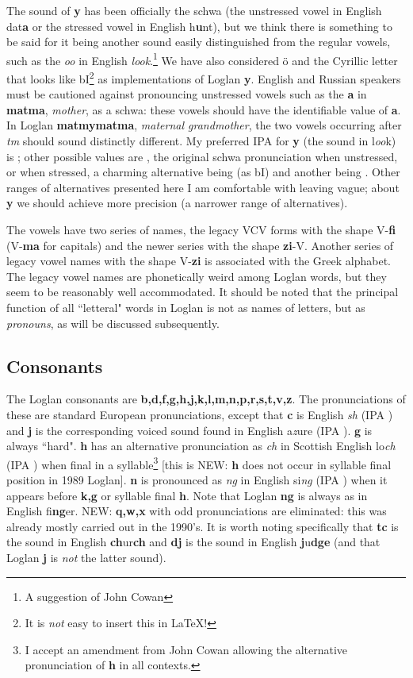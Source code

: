 \documentclass[12pt]{book}
\begin{document}
  The sound of {\bf y} has been officially the schwa (the unstressed vowel in English dat{\bf a} or the stressed vowel in English h{\bf u}nt), but we think there is something to be said for it being another sound easily distinguished from the regular vowels, such as the {\em oo} in English {\em look}.\footnote{A suggestion of John Cowan}  We have also considered \"o and the Cyrillic letter that looks like bI\footnote{It is {\em not\/} easy to insert this in LaTeX!} as implementations of Loglan {\bf y}.  English and Russian speakers must be cautioned against pronouncing unstressed vowels such as the
{\bf a} in {\bf matma}, {\em mother\/}, as a schwa:  these vowels should have the identifiable value of {\bf a}.  In Loglan {\bf matmymatma}, {\em maternal grandmother\/}, the two vowels occurring after {\em tm} should sound distinctly different.  My preferred IPA for {\bf y} (the sound in l{\em oo}k) is ;  other possible values are , the original schwa pronunciation when unstressed, or  when stressed, a charming alternative being  (as bI) and another being \textipa{\o}.  Other ranges of alternatives presented here I am comfortable with leaving vague;  about {\bf y} we should achieve more precision (a narrower range of alternatives).

The vowels have two series of names, the legacy VCV forms with the shape V-{\bf fi} (V-{\bf ma} for capitals) and the newer series with the shape {\bf zi}-V.  Another series of legacy vowel names with the shape V-{\bf zi} is associated with the Greek alphabet.  The legacy vowel names are phonetically weird among Loglan words, but they seem to be reasonably well accommodated.  It should be noted that the principal function of all ``letteral" words in Loglan is not as names of letters, but as {\em pronouns\/}, as will be discussed subsequently.
\subsection{Consonants}

The Loglan consonants are {\bf b,d,f,g,h,j,k,l,m,n,p,r,s,t,v,z}.  The pronunciations of these are standard European pronunciations, except that {\bf c} is English {\em sh} (IPA ) and {\bf j} is the corresponding voiced sound found in English a{\em z}ure (IPA ).  {\bf g} is always ``hard".  {\bf h} has an alternative pronunciation as {\em ch} in Scottish English lo{\em ch} (IPA ) when final in a syllable\footnote{I accept an amendment from John Cowan allowing the alternative pronunciation of {\bf h} in all contexts.} [this is NEW:  {\bf h} does not occur in syllable final position in 1989 Loglan].  {\bf n} is pronounced as {\em ng} in English si{\em ng} (IPA ) when it appears before {\bf k,g} or syllable final {\bf h}.  Note that Loglan {\bf ng} is always as in English fi{\bf ng}er.  NEW:  {\bf q,w,x} with odd pronunciations are eliminated:  this was already mostly carried out in the 1990's.  It is worth noting specifically that {\bf tc} is the sound in English {\bf ch}ur{\bf ch} and {\bf dj} is the sound in English {\bf j}u{\bf dge} (and that Loglan {\bf j} is {\em not\/} the latter sound).
\end{document}
